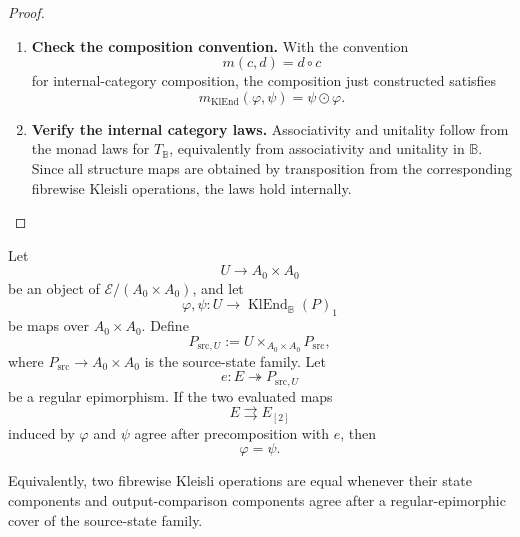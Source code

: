 \begin{proof}
\begin{enumerate}
        \item \textbf{Check the composition convention.}
        With the convention
        \[
            m(c,d)=d\circ c
        \]
        for internal-category composition, the composition just constructed
        satisfies
        \[
            m_{\operatorname{KlEnd}}(\varphi,\psi)
            =
            \psi\odot\varphi.
        \]

        \item \textbf{Verify the internal category laws.}
        Associativity and unitality follow from the monad laws for
        \(T_{\mathbb B}\), equivalently from associativity and unitality in
        \(\mathbb B\). Since all structure maps are obtained by transposition
        from the corresponding fibrewise Kleisli operations, the laws hold
        internally.
    \end{enumerate}
\end{proof}

\begin{lemma}
\label{lem:to-regular-epi-detects-kleisli-equality}
    Let
    \[
        U\to A_0\times A_0
    \]
    be an object of \(\mathcal E/(A_0\times A_0)\), and let
    \[
        \varphi,\psi:
        U\to \operatorname{KlEnd}_{\mathbb B}(P)_1
    \]
    be maps over \(A_0\times A_0\). Define
    \[
        P_{\mathrm{src},U}
        :=
        U\times_{A_0\times A_0}
        P_{\mathrm{src}},
    \]
    where \(P_{\mathrm{src}}\to A_0\times A_0\) is the source-state family.
    Let
    \[
        e:E\twoheadrightarrow P_{\mathrm{src},U}
    \]
    be a regular epimorphism. If the two evaluated maps
    \[
        E
        \rightrightarrows
        E_{[2]}
    \]
    induced by \(\varphi\) and \(\psi\) agree after precomposition with \(e\),
    then
    \[
        \varphi=\psi.
    \]

    Equivalently, two fibrewise Kleisli operations are equal whenever their
    state components and output-comparison components agree after a
    regular-epimorphic cover of the source-state family.
\end{lemma}

